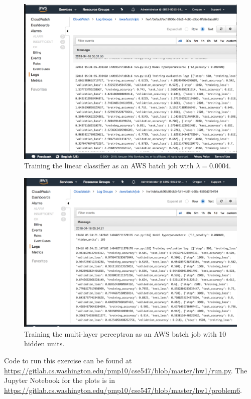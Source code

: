 \documentclass[letterpaper,11pt]{article}
\begin{document}
\begin{figure}
  \centering
  \includegraphics[width=\textwidth]{linear_screenshot.png}
  \caption{Training the linear classifier as an AWS batch job with $\lambda = 0.0004$.}
  \label{fig:linear_batch}
\end{figure}

\begin{figure}
  \centering
  \includegraphics[width=\textwidth]{mlp_10_screenshot.png}
  \caption{Training the multi-layer perceptron as an AWS batch job with 10 hidden units.}
  \label{fig:mlp_batch}
\end{figure}

Code to run this exercise can be found at
\url{https://gitlab.cs.washington.edu/pmp10/cse547/blob/master/hw1/run.py}. The
Jupyter Notebook for the plots is in
\url{https://gitlab.cs.washington.edu/pmp10/cse547/blob/master/hw1/problem6}.
\end{document}

